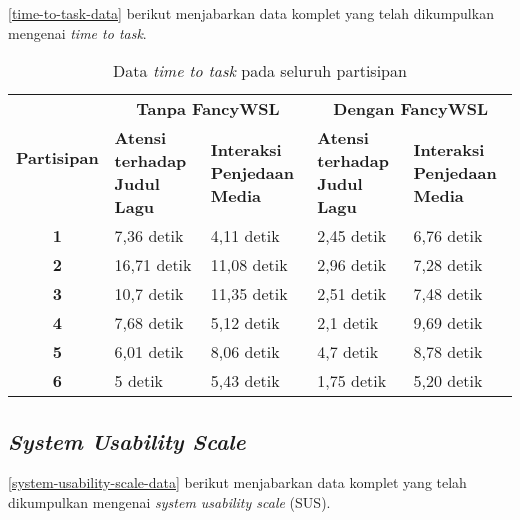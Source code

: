 \autoref{time-to-task-data} berikut menjabarkan data komplet yang telah dikumpulkan mengenai \textit{time to task}.

\begin{table}[h]
    \centering
    \caption{Data \textit{time to task} pada seluruh partisipan}
    \label{time-to-task-data}
    \begin{tabularx}{\linewidth}{|c|X|X|X|X|} \hline
        \multirow{2}{*}{\textbf{Partisipan}} & \multicolumn{2}{c|}{\textbf{Tanpa FancyWSL}} & \multicolumn{2}{c|}{\textbf{Dengan FancyWSL}}\\ \cline{2-5}
        & \textbf{Atensi terhadap Judul Lagu} & \textbf{Interaksi Penjedaan Media} & \textbf{Atensi terhadap Judul Lagu} & \textbf{Interaksi Penjedaan Media}\\ \hline
        \textbf{1} & 7,36 detik & 4,11 detik & 2,45 detik & 6,76 detik\\ \hline
        \textbf{2} & 16,71 detik & 11,08 detik & 2,96 detik & 7,28 detik\\ \hline
        \textbf{3} & 10,7 detik & 11,35 detik & 2,51 detik & 7,48 detik \\ \hline
        \textbf{4} & 7,68 detik & 5,12 detik & 2,1 detik & 9,69 detik \\ \hline
        \textbf{5} & 6,01 detik & 8,06 detik & 4,7 detik & 8,78 detik \\ \hline
        \textbf{6} & 5 detik & 5,43 detik & 1,75 detik & 5,20 detik \\ \hline
    \end{tabularx}
\end{table}

\subsection{\textit{System Usability Scale}}

\autoref{system-usability-scale-data} berikut menjabarkan data komplet yang telah dikumpulkan mengenai \textit{system usability scale} (SUS).

